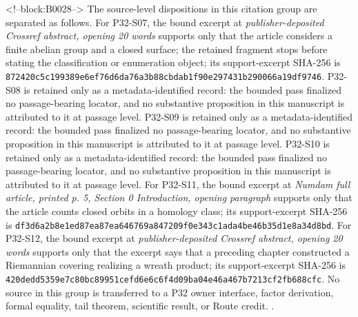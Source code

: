 \documentclass[11pt]{article}
\begin{document}
<!--block:B0028-->
The source-level dispositions in this citation group are separated as follows.
For P32-S07, the bound excerpt at \emph{publisher-deposited Crossref abstract, opening 20 words} supports only that the article considers a finite abelian group and a closed surface; the retained fragment stops before stating the classification or enumeration object; its support-excerpt SHA-256 is \texttt{872420c5\allowbreak{}c199389e\allowbreak{}6ef76d6d\allowbreak{}a76a3b88\allowbreak{}cbdab1f9\allowbreak{}0e297431\allowbreak{}b290066a\allowbreak{}19df9746}.
P32-S08 is retained only as a metadata-identified record: the bounded pass finalized no passage-bearing locator, and no substantive proposition in this manuscript is attributed to it at passage level.
P32-S09 is retained only as a metadata-identified record: the bounded pass finalized no passage-bearing locator, and no substantive proposition in this manuscript is attributed to it at passage level.
P32-S10 is retained only as a metadata-identified record: the bounded pass finalized no passage-bearing locator, and no substantive proposition in this manuscript is attributed to it at passage level.
For P32-S11, the bound excerpt at \emph{Numdam full article, printed p. 5, Section 0 Introduction, opening paragraph} supports only that the article counts closed orbits in a homology class; its support-excerpt SHA-256 is \texttt{df3d6a2b\allowbreak{}8e1ed87e\allowbreak{}a87ea646\allowbreak{}769a8472\allowbreak{}09f0e343\allowbreak{}c1ada4be\allowbreak{}46b35d1e\allowbreak{}8a34d8bd}.
For P32-S12, the bound excerpt at \emph{publisher-deposited Crossref abstract, opening 20 words} supports only that the excerpt says that a preceding chapter constructed a Riemannian covering realizing a wreath product; its support-excerpt SHA-256 is \texttt{420dedd5\allowbreak{}359e7c80\allowbreak{}bc89951c\allowbreak{}efd6e6c6\allowbreak{}f4d09ba0\allowbreak{}4e46a467\allowbreak{}b7213cf2\allowbreak{}fb688cfc}.
No source in this group is transferred to a P32 owner interface, factor derivation, formal equality, tail theorem, scientific result, or Route credit.
\citep{P32-S07,P32-S08,P32-S09,P32-S10,P32-S11,P32-S12}.
\end{document}
